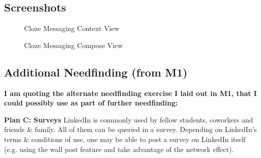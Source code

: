\documentclass[
	letterpaper, %
]{jdf}
\begin{document}
\subsection{Screenshots}

\begin{figure}[h]
	\centering
	\caption{Cloze Messaging Context View}
	\label{fig:cloze1}
\end{figure}

\begin{figure}[h]
	\centering
	\caption{Cloze Messaging Compose View}
	\label{fig:cloze2}
\end{figure}


\subsection{Additional Needfinding (from M1)}
\textbf{I am quoting the alternate needfinding exercise I laid out in M1, that I could possibly use as part of further needfinding:}

\textbf{Plan C: Surveys}
LinkedIn is commonly used by fellow students, coworkers and friends \& family. All of them can be queried in a survey. Depending on LinkedIn's terms \& conditions of use, one may be able to post a survey on LinkedIn itself (e.g. using the wall post feature and take advantage of the network effect).
\end{document}
